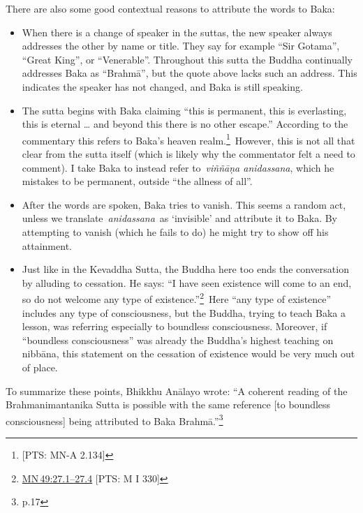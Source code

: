 \documentclass[10pt, openany]{book}
\begin{document}
There are also some good contextual reasons to attribute the words to Baka:


\begin{itemize}

\itemsep5pt\parskip0pt


\item
When there is a change of speaker in the suttas, the new speaker always addresses the other by name or title. They say for example “Sir Gotama”, “Great King”, or “Venerable”. Throughout this sutta the Buddha continually addresses Baka as “Brahmā”, but the quote above lacks such an address. This indicates the speaker has not changed, and Baka is still speaking.



\item
The sutta begins with Baka claiming “this is permanent, this is everlasting, this is eternal … and beyond this there is no other escape.” According to the commentary this refers to Baka’s heaven realm.\footnote {[PTS: MN-A 2.134]} However, this is not all that clear from the sutta itself (which is likely why the commentator felt a need to comment). I take Baka to instead refer to \textit{viññāṇa anidassana}, which he mistakes to be permanent, outside “the allness of all”.



\item
After the words are spoken, Baka tries to vanish. This seems a random act, unless we translate \textit{anidassana} as ‘invisible’ and attribute it to Baka. By attempting to vanish (which he fails to do) he might try to show off his attainment.



\item
Just like in the Kevaddha Sutta, the Buddha here too ends the conversation by alluding to cessation. He says: “I have seen existence will come to an end, so do not welcome any type of existence.”\footnote {\href{https://suttacentral.net/mn49/en/sujato\#27.1}{MN 49:27.1–27.4} [PTS: M I 330]} Here “any type of existence” includes any type of consciousness, but the Buddha, trying to teach Baka a lesson, was referring especially to boundless consciousness. Moreover, if “boundless consciousness” was already the Buddha’s highest teaching on nibbāna, this statement on the cessation of existence would be very much out of place.





\end{itemize}
To summarize these points, Bhikkhu Anālayo wrote: “A coherent reading of the Brahmanimantanika Sutta is possible with the same reference [to boundless consciousness] being attributed to Baka Brahmā.”\footnote {\cite{Anālayo 2017} p.17}
\end{document}
